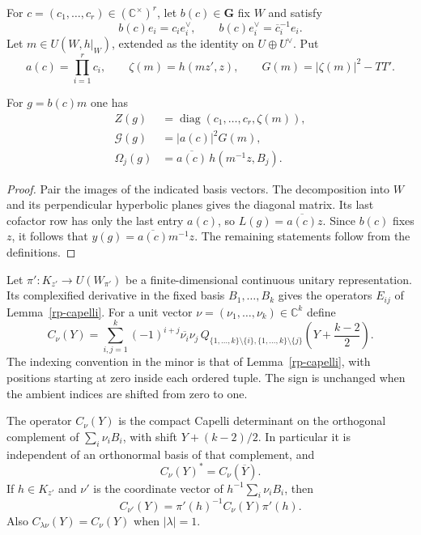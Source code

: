 For $c=(c_1,\ldots,c_r)\in(\mathbb C^\times)^r$,
let $b(c)\in\mathbf G$ fix $W$ and satisfy
\[
 b(c)e_i=c_i e_i^\vee,\qquad
 b(c)e_i^\vee=\overline c_i^{-1}e_i.
\]
Let $m\in U(W,h|_W)$, extended as the identity on
$U\oplus U^\vee$.  Put
\[
             a(c)=\prod_{i=1}^r c_i,\qquad
             \zeta(m)=h(mz',z),\qquad
             G(m)=|\zeta(m)|^2-TT'.
\]

\begin{lemma}\label{rl-cell}
For $g=b(c)m$ one has
\begin{align}
 Z(g)&=\operatorname{diag}(c_1,\ldots,c_r,\zeta(m)),\nonumber\\
 \mathcal G(g)&=|a(c)|^2G(m),\label{rl-cell-Gram}\\
 \Omega_j(g)&=\overline{a(c)}\,h(m^{-1}z,B_j).
                                                 \label{rl-cell-omega}
\end{align}
\end{lemma}

\begin{proof}
Pair the images of the indicated basis vectors.
The decomposition into $W$ and its perpendicular
hyperbolic planes gives the diagonal matrix.
Its last cofactor row has only the last entry
$a(c)$, so $L(g)=\overline{a(c)}z$.
Since $b(c)$ fixes $z$, it follows that
$y(g)=\overline{a(c)}m^{-1}z$.
The remaining statements follow from the definitions.
\end{proof}

Let $\pi':K_{z'}\to U(W_{\pi'})$ be a finite-dimensional
continuous unitary representation.  Its complexified
derivative in the fixed basis $B_1,\ldots,B_k$
gives the operators $E_{ij}$ of
Lemma~\ref{rp-capelli}.  For a unit vector
$\nu=(\nu_1,\ldots,\nu_k)\in\mathbb C^k$ define
\begin{equation}\label{rl-cap-vector}
 C_\nu(Y)=\sum_{i,j=1}^k(-1)^{i+j}
       \overline{\nu_i}\nu_j\,
       Q_{\{1,\ldots,k\}\setminus\{i\},
         \{1,\ldots,k\}\setminus\{j\}}
          \left(Y+\frac{k-2}{2}\right).
\end{equation}
The indexing convention in the minor is that of
Lemma~\ref{rp-capelli}, with positions starting at zero
inside each ordered tuple.  The sign is unchanged
when the ambient indices are shifted from zero to one.

\begin{lemma}\label{rl-compressed-capelli}
The operator $C_\nu(Y)$ is the compact Capelli
determinant on the orthogonal complement of
$\sum_i\nu_iB_i$, with shift $Y+(k-2)/2$.
In particular it is independent of an orthonormal
basis of that complement, and
\[
 C_\nu(Y)^*=C_\nu(\overline Y).
\]
If $h\in K_{z'}$ and $\nu'$ is the coordinate vector
of $h^{-1}\sum_i\nu_iB_i$, then
\begin{equation}\label{rl-cap-covariance}
          C_{\nu'}(Y)=\pi'(h)^{-1}C_\nu(Y)\pi'(h).
\end{equation}
Also $C_{\lambda\nu}(Y)=C_\nu(Y)$ when $|\lambda|=1$.
\end{lemma}

